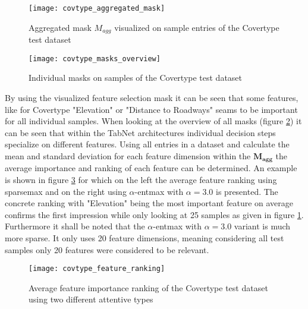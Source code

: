 \documentclass[../main.tex]{subfiles}
\begin{document}
\begin{figure}[H]
    \centering
    \texttt{[image: covtype\_aggregated\_mask]}        
    \caption{Aggregated mask $M_{agg}$ visualized on sample entries of the Covertype test dataset}
    \label{fig:covtype_aggregated_mask}
\end{figure}

\begin{figure}[H]
    \centering
    \texttt{[image: covtype\_masks\_overview]}        
    \caption{Individual masks on samples of the Covertype test dataset}
    \label{fig:covtype_masks_overview}
\end{figure}

By using the visualized feature selection mask it can be seen that some features, like for Covertype "Elevation" or "Distance to Roadways" seams to be important for all individual samples. When looking at the overview of all masks (figure \ref{fig:covtype_masks_overview}) it can be seen that within the TabNet architectures individual decision steps specialize on different features. 
Using all entries in a dataset and calculate the mean and standard deviation for each feature dimension within the $\mathbf{M_{agg}}$ the average importance and ranking of each feature can be determined. An example is shown in figure \ref{fig:covtype_feature_ranking} for which on the left the average feature ranking using sparsemax and on the right using $\alpha$-entmax with $\alpha=3.0$ is presented. The concrete ranking with "Elevation" being the most important feature on average confirms the first impression while only looking at 25 samples as given in figure \ref{fig:covtype_aggregated_mask}. Furthermore it shall be noted that the $\alpha$-entmax with $\alpha=3.0$ variant is much more sparse. It only uses 20 feature dimensions, meaning considering all test samples only 20 features were considered to be relevant. 

\begin{figure}[H]
    \centering
    \texttt{[image: covtype\_feature\_ranking]}        
    \caption{Average feature importance ranking of the Covertype test dataset using two different attentive types}
    \label{fig:covtype_feature_ranking}
\end{figure}

\newpage
    
\end{document}
